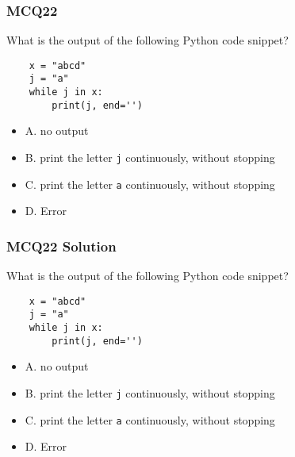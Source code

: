 \documentclass{beamer}
\begin{document}
\begin{frame}[fragile]
    \frametitle{MCQ22}
    What is the output of the following Python code snippet?
    \begin{verbatim}
    x = "abcd"
    j = "a"
    while j in x:
        print(j, end='')
    \end{verbatim}
    \begin{itemize}
        \item A. no output
        \item B. print the letter \texttt{j} continuously, without stopping
        \item C. print the letter \texttt{a} continuously, without stopping
        \item D. Error
    \end{itemize}
\end{frame}
\begin{frame}[fragile]
    \frametitle{MCQ22 Solution}
    What is the output of the following Python code snippet?
    \begin{verbatim}
    x = "abcd"
    j = "a"
    while j in x:
        print(j, end='')
    \end{verbatim}
    \begin{itemize}
        \item A. no output
        \item B. print the letter \texttt{j} continuously, without stopping
        \item \alert{C. print the letter \texttt{a} continuously, without stopping}
        \item D. Error
    \end{itemize}
\end{frame}
\end{document}
